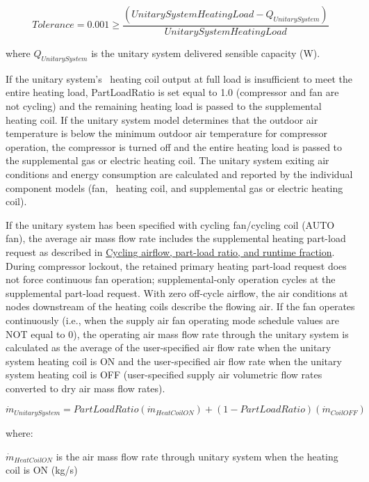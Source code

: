 \begin{equation}
Tolerance = 0.001 \ge \frac{{\left( {UnitarySystemHeatingLoad - {Q_{UnitarySystem}}} \right)}}{{UnitarySystemHeatingLoad}}
\end{equation}

where \({Q_{UnitarySystem}}\) is the unitary system delivered sensible capacity (W).

If the unitary system's~ heating coil output at full load is insufficient to meet the entire heating load, PartLoadRatio is set equal to 1.0 (compressor and fan are not cycling) and the remaining heating load is passed to the supplemental heating coil. If the unitary system model determines that the outdoor air temperature is below the minimum outdoor air temperature for compressor operation, the compressor is turned off and the entire heating load is passed to the supplemental gas or electric heating coil. The unitary system exiting air conditions and energy consumption are calculated and reported by the individual component models (fan,~ heating coil, and supplemental gas or electric heating coil).

If the unitary system has been specified with cycling fan/cycling coil (AUTO fan), the average air mass flow rate includes the supplemental heating part-load request as described in \hyperref[unitary-system-cycling-airflow]{Cycling airflow, part-load ratio, and runtime fraction}. During compressor lockout, the retained primary heating part-load request does not force continuous fan operation; supplemental-only operation cycles at the supplemental part-load request. With zero off-cycle airflow, the air conditions at nodes downstream of the heating coils describe the flowing air. If the fan operates continuously (i.e., when the supply air fan operating mode schedule values are NOT equal to 0), the operating air mass flow rate through the unitary system is calculated as the average of the user-specified air flow rate when the unitary system heating coil is ON and the user-specified air flow rate when the unitary system heating coil is OFF (user-specified supply air volumetric flow rates converted to dry air mass flow rates).

\begin{equation}
\dot{m}_{UnitarySystem} = PartLoadRatio\left( \dot{m}_{HeatCoilON} \right) + \left( 1 - PartLoadRatio \right)\left( \dot{m}_{CoilOFF} \right)
\end{equation}

where:

\(\dot m_{HeatCoilON}\) is the air mass flow rate through unitary system when the heating coil is ON (kg/s)

